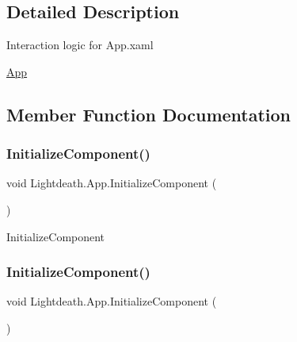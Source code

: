 \subsection{Detailed Description}
Interaction logic for App.\+xaml 

\hyperlink{class_lightdeath_1_1_app}{App} 

\subsection{Member Function Documentation}
\hypertarget{class_lightdeath_1_1_app_a7bd1852993058f1a829307ce757eed11}{}\label{class_lightdeath_1_1_app_a7bd1852993058f1a829307ce757eed11} 
\subsubsection{\texorpdfstring{Initialize\+Component()}{InitializeComponent()}\hspace{0.1cm}{\footnotesize\ttfamily [1/2]}}
{\footnotesize\ttfamily void Lightdeath.\+App.\+Initialize\+Component (\begin{DoxyParamCaption}{ }\end{DoxyParamCaption})\hspace{0.3cm}{\ttfamily [inline]}}



Initialize\+Component 

\hypertarget{class_lightdeath_1_1_app_a7bd1852993058f1a829307ce757eed11}{}\label{class_lightdeath_1_1_app_a7bd1852993058f1a829307ce757eed11} 
\subsubsection{\texorpdfstring{Initialize\+Component()}{InitializeComponent()}\hspace{0.1cm}{\footnotesize\ttfamily [2/2]}}
{\footnotesize\ttfamily void Lightdeath.\+App.\+Initialize\+Component (\begin{DoxyParamCaption}{ }\end{DoxyParamCaption})\hspace{0.3cm}{\ttfamily [inline]}}




